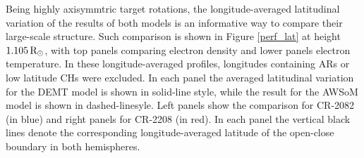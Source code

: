 \documentclass[namedreferences]{solarphysics}
\newcommand{\mrsun}{{\rm R_\odot}}
\begin{document}
\begin{article}
{Being highly axisymmtric target rotations, the longitude-averaged latitudinal variation of the results of both models is an informative way to compare their large-scale structure. Such comparison is shown in Figure \ref{perf_lat} at height $1.105\,\mrsun$, with top panels comparing electron density and lower panels electron temperature. In these longitude-averaged profiles, longitudes containing ARs or low latitude CHs were excluded. In each panel the averaged latitudinal variation for the DEMT model is shown in solid-line style, while the result for the AWSoM model is shown in dashed-linesyle. Left panels show the comparison for CR-2082 (in blue) and right panels for CR-2208 (in red). In each panel the vertical black lines denote the corresponding longitude-averaged latitude of the open-close boundary in both hemispheres.}


\end{article}
\end{document}
